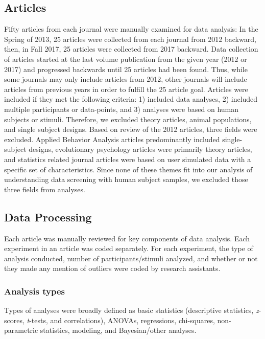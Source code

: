 \documentclass[english,,man]{apa6}
\begin{document}
\hypertarget{articles}{%
\subsection{Articles}\label{articles}}

Fifty articles from each journal were manually examined for data analysis: In the Spring of 2013, 25 articles were collected from each journal from 2012 backward, then, in Fall 2017, 25 articles were collected from 2017 backward. Data collection of articles started at the last volume publication from the given year (2012 or 2017) and progressed backwards until 25 articles had been found. Thus, while some journals may only include articles from 2012, other journals will include articles from previous years in order to fulfill the 25 article goal. Articles were included if they met the following criteria: 1) included data analyses, 2) included multiple participants or data-points, and 3) analyses were based on human subjects or stimuli. Therefore, we excluded theory articles, animal populations, and single subject designs. Based on review of the 2012 articles, three fields were excluded. Applied Behavior Analysis articles predominantly included single-subject designs, evolutionary psychology articles were primarily theory articles, and statistics related journal articles were based on user simulated data with a specific set of characteristics. Since none of these themes fit into our analysis of understanding data screening with human subject samples, we excluded those three fields from analyses.

\hypertarget{data-processing}{%
\subsection{Data Processing}\label{data-processing}}

Each article was manually reviewed for key components of data analysis. Each experiment in an article was coded separately. For each experiment, the type of analysis conducted, number of participants/stimuli analyzed, and whether or not they made any mention of outliers were coded by research assistants.

\hypertarget{analysis-types}{%
\subsubsection{Analysis types}\label{analysis-types}}

Types of analyses were broadly defined as basic statistics (descriptive statistics, \emph{z}-scores, \emph{t}-tests, and correlations), ANOVAs, regressions, chi-squares, non-parametric statistics, modeling, and Bayesian/other analyses.
\end{document}
